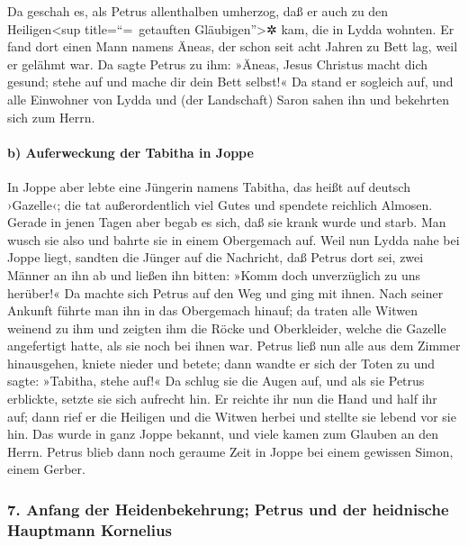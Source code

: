  Da geschah es, als Petrus allenthalben umherzog, daß er
auch zu den Heiligen\textless sup title=``=~getauften
Gläubigen''\textgreater✲ kam, die in Lydda wohnten.  Er
fand dort einen Mann namens Äneas, der schon seit acht Jahren zu Bett
lag, weil er gelähmt war.  Da sagte Petrus zu ihm:
»Äneas, Jesus Christus macht dich gesund; stehe auf und mache dir dein
Bett selbst!« Da stand er sogleich auf,  und alle
Einwohner von Lydda und (der Landschaft) Saron sahen ihn und bekehrten
sich zum Herrn.

\hypertarget{b-auferweckung-der-tabitha-in-joppe}{%
\paragraph{b) Auferweckung der Tabitha in
Joppe}\label{b-auferweckung-der-tabitha-in-joppe}}

 In Joppe aber lebte eine Jüngerin namens Tabitha, das
heißt auf deutsch ›Gazelle‹; die tat außerordentlich viel Gutes und
spendete reichlich Almosen.  Gerade in jenen Tagen aber
begab es sich, daß sie krank wurde und starb. Man wusch sie also und
bahrte sie in einem Obergemach auf.  Weil nun Lydda nahe
bei Joppe liegt, sandten die Jünger auf die Nachricht, daß Petrus dort
sei, zwei Männer an ihn ab und ließen ihn bitten: »Komm doch
unverzüglich zu uns herüber!«  Da machte sich Petrus auf
den Weg und ging mit ihnen. Nach seiner Ankunft führte man ihn in das
Obergemach hinauf; da traten alle Witwen weinend zu ihm und zeigten ihm
die Röcke und Oberkleider, welche die Gazelle angefertigt hatte, als sie
noch bei ihnen war.  Petrus ließ nun alle aus dem Zimmer
hinausgehen, kniete nieder und betete; dann wandte er sich der Toten zu
und sagte: »Tabitha, stehe auf!« Da schlug sie die Augen auf, und als
sie Petrus erblickte, setzte sie sich aufrecht hin.  Er
reichte ihr nun die Hand und half ihr auf; dann rief er die Heiligen und
die Witwen herbei und stellte sie lebend vor sie hin. 
Das wurde in ganz Joppe bekannt, und viele kamen zum Glauben an den
Herrn.  Petrus blieb dann noch geraume Zeit in Joppe bei
einem gewissen Simon, einem Gerber.

\hypertarget{anfang-der-heidenbekehrung-petrus-und-der-heidnische-hauptmann-kornelius}{%
\subsubsection{7. Anfang der Heidenbekehrung; Petrus und der heidnische
Hauptmann
Kornelius}\label{anfang-der-heidenbekehrung-petrus-und-der-heidnische-hauptmann-kornelius}}

